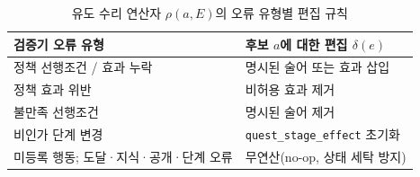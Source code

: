 \begin{table}[!tbp]
\caption{유도 수리 연산자 $\rho(a,E)$의 오류 유형별 편집 규칙}
\label{tab:rho-rules}
\centering
\footnotesize
\begin{tabularx}{\columnwidth}{@{}>{\raggedright\arraybackslash}X>{\raggedright\arraybackslash}X@{}}
\toprule
\textbf{검증기 오류 유형} & \textbf{후보 $a$에 대한 편집 $\delta(e)$} \\
\midrule
정책 선행조건 / 효과 누락 & 명시된 술어 또는 효과 삽입 \\
정책 효과 위반 & 비허용 효과 제거 \\
불만족 선행조건 & 명시된 술어 제거 \\
비인가 단계 변경 & \texttt{quest\_stage\_effect} 초기화 \\
미등록 행동; 도달·지식·공개·단계 오류 & 무연산(no-op, 상태 세탁 방지) \\
\bottomrule
\end{tabularx}
\end{table}
